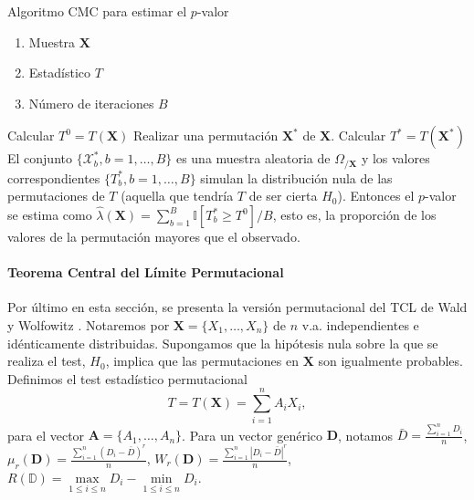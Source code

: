 \begin{algorithm}
	\caption{Algoritmo CMC para estimar el $p$-valor}
	\label{alg:CMC-pvalue}
	\begin{algorithmic}[1]
	\REQUIRE
		\begin{enumerate}[a]
		\item Muestra $\mathbf{X}$
		\item Estadístico $T$
		\item Número de iteraciones $B$
		\end{enumerate}
		\STATE Calcular $T^0 = T(\mathbf{X})$
			\STATE Realizar una permutación $\mathbf{X}^*$ de  
			$\mathbf{X}$.
			\STATE Calcular $T^* = T(\mathbf{X}^*)$
		\ENDFOR
		\STATE El conjunto $\{ \mathcal{X}^*_b, b = 1, \dots, 
		B \}$ es una muestra aleatoria de 
		$\Omega_{/\mathbf{X}}$ y los valores correspondientes 
		$\{ T^*_b, b = 1, \dots, B \}$ simulan la 
		distribución nula de las permutaciones de $T$ 
		(aquella que tendría $T$ de ser cierta $H_0$). 
		Entonces el $p$-valor se estima como $\hat{\lambda}
		(\mathbf{X}) = \sum\limits_{b=1}^B 
		\mathbb{I}[T_b^* \geq T^0]/B$, esto es, la proporción 
		de los valores de la permutación mayores que el 
		observado.
	\end{algorithmic}
\end{algorithm}

\paragraph{Teorema Central del Límite Permutacional}
	Por último en esta sección, se presenta la versión 
permutacional del TCL de Wald y Wolfowitz \cite{WALWOL44}.
Notaremos por $\mathbf{X} = \{X_1, \dots, X_n\}$ de $n$ v.a. 
independientes e idénticamente distribuidas. Supongamos que 
la hipótesis nula sobre la que se realiza el test, $H_0$, 
implica que las permutaciones en $\mathbf{X}$ son igualmente 
probables.\\
	Definimos el test estadístico permutacional
	\[
		T = T(\mathbf{X}) = 
			\sum\limits_{i=1}^n
				A_i X_i,
	\]
	para el vector $\mathbf{A} = \{A_1, \dots, A_n\}$. Para 
un vector genérico $\mathbf{D}$, notamos $\bar{D} = 
\frac{\sum\limits_{i=1}^n D_i}{n}$, $\mu_r(\mathbf{D}) = 
\frac{\sum\limits_{i=1}^n (D_i - \bar{D})^r}{n}$, 
$W_r(\mathbf{D}) = \frac{\sum\limits_{i=1}^n 
|D_i - \bar{D}|^r}{n}$, $R(\mathbb{D}) = 
\underset{1 \leq i \leq n}{\max} D_i - 
\underset{1 \leq i \leq n}{\min} D_i$.\\

